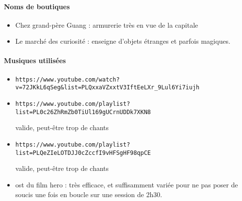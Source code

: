 \documentclass[10pt,a4paper]{book}
\begin{document}
\paragraph{Noms de boutiques}
\begin{itemize}
\item Chez grand-père Guang : armurerie très en vue de la capitale
\item Le marché des curiosité : enseigne d'objets étranges et parfois magiques.
\end{itemize}
\paragraph{Musiques utilisées}
\begin{itemize}
\item \begin{verbatim}https://www.youtube.com/watch?v=72JKkL6qSeg&list=PLQxxaVZxxtV3IftEeLXr_9Lul6Yi7iujh \end{verbatim}
\item \begin{verbatim}https://www.youtube.com/playlist?list=PL0c26ZhRmZb0TiUl169gUCrnUDDk7XKN8\end{verbatim} valide, peut-être trop de chants
\item \begin{verbatim}https://www.youtube.com/playlist?list=PLQeZIeLOTDJJ0cZccfI9vHFSgHF98qpCE\end{verbatim} valide, peut-être trop de chants
\item ost du film hero : très efficace, et suffisamment variée pour ne pas poser de soucis une fois en boucle sur une session de 2h30.
\end{itemize}
\end{document}

